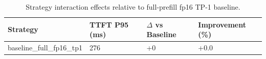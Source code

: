 \begin{table}
\caption{Strategy interaction effects relative to full-prefill fp16 TP-1 baseline.}
\label{tab:interactions}
\begin{tabular}{llll}
\toprule
Strategy & TTFT P95 (ms) & $\Delta$ vs Baseline & Improvement (\%) \\
\midrule
baseline\_full\_fp16\_tp1 & 276 & +0 & +0.0 \\
\bottomrule
\end{tabular}
\end{table}
